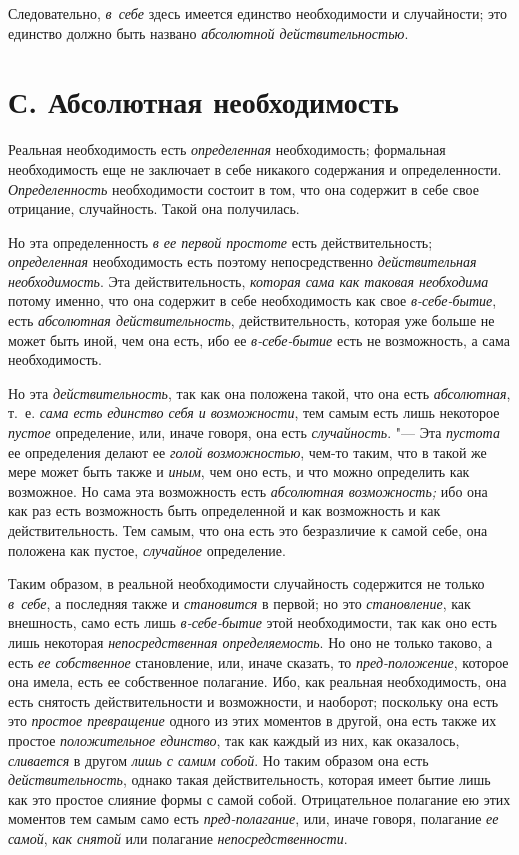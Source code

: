 Следовательно, {\em в~себе} здесь имеется единство
необходимости и случайности; это единство должно быть названо
{\em абсолютной действительностью}.

\section[С. Абсолютная необходимость]{С. Абсолютная необходимость}

Реальная необходимость есть {\em определенная} необходимость; формальная
необходимость еще не заключает в себе никакого содержания и определенности.
{\em Определенность} необходимости состоит в том, что
она содержит в себе свое отрицание, случайность. Такой она получилась.

Но эта определенность {\em в ее первой простоте} есть
действительность; {\em определенная} необходимость есть
поэтому непосредственно {\em действительная
необходимость}. Эта действительность, {\em которая сама
как таковая необходима} потому именно, что она содержит в себе
необходимость как свое {\em в-себе-бытие}, есть
{\em абсолютная действительность}, действительность,
которая уже больше не может быть иной, чем она есть, ибо ее
{\em в-себе-бытие} есть не возможность, а сама необходимость.

Но эта {\em действительность}, так как она положена
такой, что она есть {\em абсолютная}, т.~е.
{\em сама есть единство себя и возможности}, тем самым
есть лишь некоторое {\em пустое} определение, или,
иначе говоря, она есть {\em случайность}. "--- Эта
{\em пустота} ее определения делают ее
{\em голой возможностью}, чем-то таким, что в такой же
мере может быть также и {\em иным}, чем оно есть, и что
можно определить как возможное. Но сама эта возможность есть
{\em абсолютная возможность;} ибо она как раз есть
возможность быть определенной и как возможность и как действительность. Тем
самым, что она есть это безразличие к самой себе, она положена как пустое,
{\em случайное} определение.

Таким образом, в реальной необходимости случайность содержится не только
{\em в~себе}, а последняя также и {\em становится} в первой; но это
{\em становление}, как внешность, само есть лишь
{\em в-себе-бытие} этой необходимости, так как оно есть
лишь некоторая {\em непосредственная определяемость}.
Но оно не только таково, а есть {\em ее собственное}
становление, или, иначе сказать, то
{\em пред-положение}, которое она имела, есть ее
собственное полагание. Ибо, как реальная необходимость, она есть снятость
действительности и возможности, и наоборот; поскольку она есть это
{\em простое превращение} одного из этих моментов в
другой, она есть также их простое {\em положительное
единство}, так как каждый из них, как оказалось,
{\em сливается} в другом {\em лишь
с самим собой}. Но таким образом она есть
{\em действительность}, однако такая действительность,
которая имеет бытие лишь как это простое слияние формы с самой собой.
Отрицательное полагание ею этих моментов тем самым само есть
{\em пред-полагание}, или, иначе говоря, полагание
{\em ее самой}, {\em как снятой}
или полагание {\em непосредственности}.

